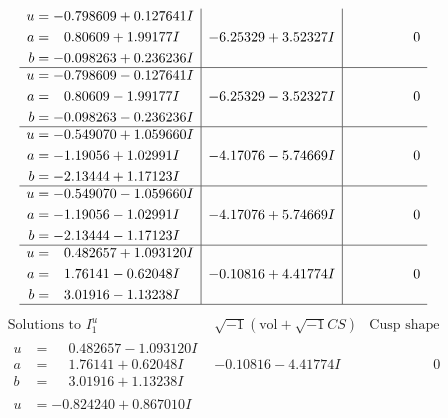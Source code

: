 \documentclass[1p]{elsarticle_modified}
\theoremstyle{definition}
\newcommand{\I}{\sqrt{-1}}
\begin{document}
$$\begin{array}{c|c|c}
\begin{aligned}
u &= -0.798609 + 0.127641 I \\
a &= \phantom{-}0.80609 + 1.99177 I \\
b &= -0.098263 + 0.236236 I\end{aligned}
 & -6.25329 + 3.52327 I & \phantom{-0.000000 } 0 \\ \hline\begin{aligned}
u &= -0.798609 - 0.127641 I \\
a &= \phantom{-}0.80609 - 1.99177 I \\
b &= -0.098263 - 0.236236 I\end{aligned}
 & -6.25329 - 3.52327 I & \phantom{-0.000000 } 0 \\ \hline\begin{aligned}
u &= -0.549070 + 1.059660 I \\
a &= -1.19056 + 1.02991 I \\
b &= -2.13444 + 1.17123 I\end{aligned}
 & -4.17076 - 5.74669 I & \phantom{-0.000000 } 0 \\ \hline\begin{aligned}
u &= -0.549070 - 1.059660 I \\
a &= -1.19056 - 1.02991 I \\
b &= -2.13444 - 1.17123 I\end{aligned}
 & -4.17076 + 5.74669 I & \phantom{-0.000000 } 0 \\ \hline\begin{aligned}
u &= \phantom{-}0.482657 + 1.093120 I \\
a &= \phantom{-}1.76141 - 0.62048 I \\
b &= \phantom{-}3.01916 - 1.13238 I\end{aligned}
 & -0.10816 + 4.41774 I & \phantom{-0.000000 } 0\\
 \hline 
 \end{array}$$\newpage$$\begin{array}{c|c|c}  
\text{Solutions to }I^u_{1}& \I (\text{vol} + \sqrt{-1}CS) & \text{Cusp shape}\\
 \hline 
\begin{aligned}
u &= \phantom{-}0.482657 - 1.093120 I \\
a &= \phantom{-}1.76141 + 0.62048 I \\
b &= \phantom{-}3.01916 + 1.13238 I\end{aligned}
 & -0.10816 - 4.41774 I & \phantom{-0.000000 } 0 \\ \hline\begin{aligned}
u &= -0.824240 + 0.867010 I \\

\end{aligned}
\end{array}$$
\end{document}
